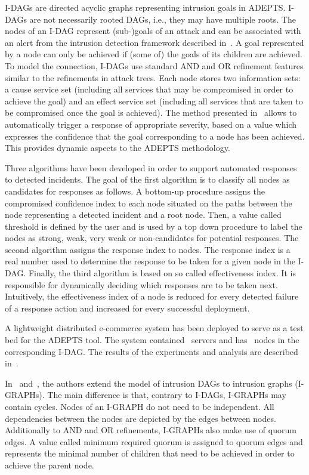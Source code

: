 \documentclass[a4paper]{article}
\begin{document}
I-DAGs are directed acyclic  graphs representing intrusion goals in ADEPTS. 
I-DAGs are not necessarily rooted DAGs, i.e., they may have multiple roots.  The
 nodes of an I-DAG represent (sub-)goals  of an attack and can be  associated
with an alert from the intrusion detection framework described 
in~\cite{conf/acsac/WuFMB03}. A goal represented by a node can only be achieved 
if (some of) the goals of its children are achieved. To model the connection, 
I-DAGs use standard AND and OR refinement features similar to the refinements 
in attack trees. Each node stores two information sets: a cause service set 
(including all services that may be compromised in order to  achieve the goal)
and an effect service set (including all services that are  taken to be
compromised once the goal is achieved). The method presented
in~\cite{BagchiTech} allows to automatically trigger a response of appropriate
severity, based on a value which expresses the confidence that the goal 
corresponding to a node has been achieved. This provides dynamic aspects to the 
ADEPTS methodology. 

Three algorithms have been developed in order to support automated responses to
detected incidents. The goal of the first algorithm is to classify all nodes as
candidates for responses as follows. A bottom-up procedure assigns the 
compromised confidence index to each node situated on the paths between the 
node representing a detected incident and a root node. Then, a value called 
threshold is defined by the user and is  used by a top down procedure to label
the nodes as strong, weak, very  weak or  non-candidates for potential
responses. The second algorithm assigns the  response index to nodes. The
response index is a real number used to  determine the response to be taken for
a given node in the I-DAG. Finally,  the third algorithm is  based on so called
effectiveness index. It is responsible for dynamically  deciding which responses
are to be taken next. Intuitively, the effectiveness  index of a node is reduced
for every detected failure of a response action and  increased for every
successful deployment.

A lightweight distributed e-commerce system has been deployed to serve as a 
test bed for the  ADEPTS tool. The system contained~ servers and has~
nodes in the  corresponding I-DAG. The results of the experiments and analysis
are  described in~\cite{BagchiTech}. 

In~\cite{FoWuMaBaSp} and~\cite{FoWuMaBaSpTech}, the authors extend the model of 
intrusion DAGs to intrusion graphs (I-GRAPHs). The main difference is that, 
contrary to I-DAGs, I-GRAPHs may contain cycles. Nodes of an I-GRAPH do not 
need to be independent. All dependencies between the nodes are depicted by the 
edges between nodes. Additionally to AND and OR refinements, I-GRAPHs also make 
use of quorum edges. A value called minimum required quorum is assigned to 
quorum edges and represents the minimal number of children that need to be 
achieved in order to achieve the parent node.
\end{document}
